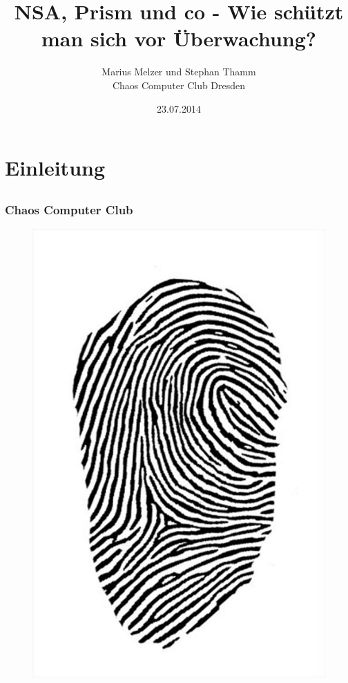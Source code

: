 \documentclass[12pt]{beamer}
\title{NSA, Prism und co - Wie schützt man sich vor Überwachung?}
\author{\small Marius Melzer und Stephan Thamm\\\large Chaos Computer Club Dresden}
\date{23.07.2014}
\begin{document}
\maketitle

\section{Einleitung}
\subsection{}

\begin{frame}
  \frametitle{Chaos Computer Club}
  \begin{figure}
    \includegraphics[height=0.7\textheight]{img/fingerabdruck.jpg}
  \end{figure}
\end{frame}
\end{document}
